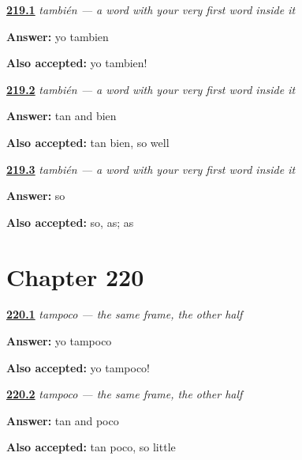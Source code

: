 \noindent\begin{minipage}[t]{\linewidth}
\raggedright
\hyperlink{review-ES-C58-tambien-agree}{\textbf{219.1}} \emph{también — a word with your very first word inside it}\par
\small \textbf{Answer:} yo tambien\par
\footnotesize \textbf{Also accepted:} yo tambien!
\end{minipage}\par\medskip

\noindent\begin{minipage}[t]{\linewidth}
\raggedright
\hyperlink{review-ES-C58-tambien-parts}{\textbf{219.2}} \emph{también — a word with your very first word inside it}\par
\small \textbf{Answer:} tan and bien\par
\footnotesize \textbf{Also accepted:} tan bien, so well
\end{minipage}\par\medskip

\noindent\begin{minipage}[t]{\linewidth}
\raggedright
\hyperlink{review-ES-C58-tambien-tan}{\textbf{219.3}} \emph{también — a word with your very first word inside it}\par
\small \textbf{Answer:} so\par
\footnotesize \textbf{Also accepted:} so, as; as
\end{minipage}\par\medskip

\section*{Chapter 220}

\noindent\begin{minipage}[t]{\linewidth}
\raggedright
\hyperlink{review-ES-C58-tampoco-agree}{\textbf{220.1}} \emph{tampoco — the same frame, the other half}\par
\small \textbf{Answer:} yo tampoco\par
\footnotesize \textbf{Also accepted:} yo tampoco!
\end{minipage}\par\medskip

\noindent\begin{minipage}[t]{\linewidth}
\raggedright
\hyperlink{review-ES-C58-tampoco-parts}{\textbf{220.2}} \emph{tampoco — the same frame, the other half}\par
\small \textbf{Answer:} tan and poco\par
\footnotesize \textbf{Also accepted:} tan poco, so little
\end{minipage}\par\medskip

